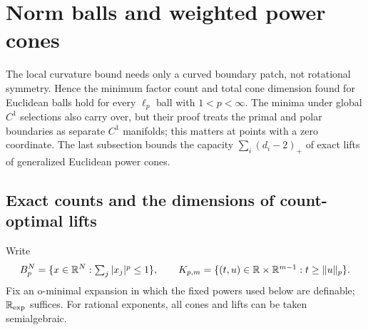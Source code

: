 \section{Norm balls and weighted power cones}
\label{sec:lp-power}
The local curvature bound needs only a curved boundary patch, not
rotational symmetry. Hence the minimum factor count and total cone
dimension found for Euclidean balls hold for every $\ell_p$ ball with
$1<p<\infty$. The minima under global $C^1$ selections also carry over,
but their proof treats the primal and polar boundaries as separate $C^1$
manifolds; this matters at points with a zero coordinate. The last
subsection bounds the capacity $\sum_i(d_i-2)_+$ of exact lifts of
generalized Euclidean power cones.

\subsection{Exact counts and the dimensions of count-optimal lifts}
Write
\[
 B_p^N=\{x\in\mathbb R^N:\textstyle\sum_j|x_j|^p\leq1\},\qquad
 K_{p,m}=\{(t,u)\in\mathbb R\times\mathbb R^{m-1}:t\geq\lVert u\rVert_p\}.
\]
Fix an o-minimal expansion in which the fixed powers used below are
definable; $\mathbb R_{\exp}$ suffices. For rational exponents, all cones and
lifts can be taken semialgebraic.


